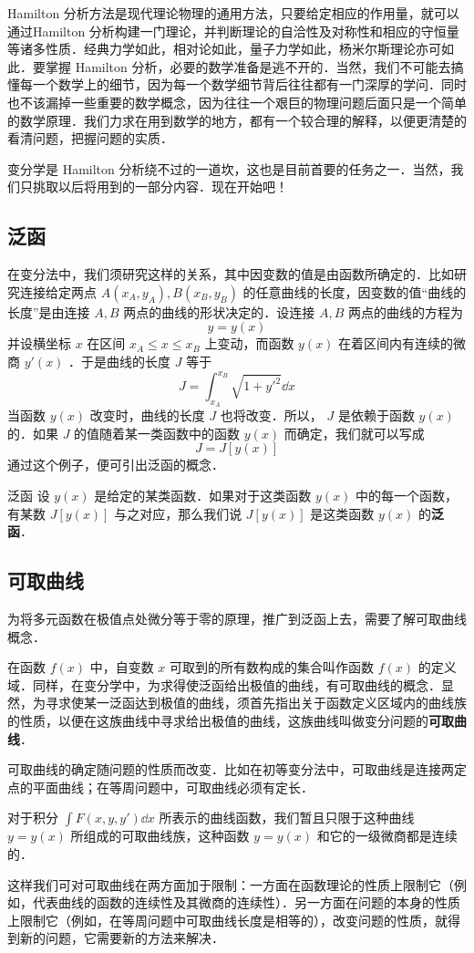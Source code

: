 
Hamilton 分析方法是现代理论物理的通用方法，只要给定相应的作用量，就可以通过Hamilton 分析构建一门理论，并判断理论的自洽性及对称性和相应的守恒量等诸多性质．经典力学如此，相对论如此，量子力学如此，杨米尔斯理论亦可如此．要掌握 Hamilton 分析，必要的数学准备是逃不开的．当然，我们不可能去搞懂每一个数学上的细节，因为每一个数学细节背后往往都有一门深厚的学问．同时也不该漏掉一些重要的数学概念，因为往往一个艰巨的物理问题后面只是一个简单的数学原理．我们力求在用到数学的地方，都有一个较合理的解释，以便更清楚的看清问题，把握问题的实质．

变分学是 Hamilton 分析绕不过的一道坎，这也是目前首要的任务之一．当然，我们只挑取以后将用到的一部分内容．现在开始吧！
\subsection{泛函}
在变分法中，我们须研究这样的关系，其中因变数的值是由函数所确定的．比如研究连接给定两点 $A(x_A,y_A),B(x_B,y_B)$ 的任意曲线的长度，因变数的值“曲线的长度”是由连接 $A,B$ 两点的曲线的形状决定的．设连接 $A,B$ 两点的曲线的方程为
\begin{equation}
y=y(x)
\end{equation}
并设横坐标 $x$ 在区间 $x_A\leq x\leq x_B$ 上变动，而函数 $y(x)$ 在着区间内有连续的微商 $y'(x)$ ．于是曲线的长度 $J$ 等于
\begin{equation}
J=\int_{x_A}^{x_B} \sqrt{1+y'^2}\dd x
\end{equation}
当函数 $y(x)$ 改变时，曲线的长度 $J$ 也将改变．所以， $J$ 是依赖于函数 $y(x)$ 的．如果 $J$ 的值随着某一类函数中的函数 $y(x)$ 而确定，我们就可以写成
\begin{equation}
J=J[y(x)]
\end{equation}
通过这个例子，便可引出泛函的概念．
\begin{definition}{泛函}
设 $y(x)$ 是给定的某类函数．如果对于这类函数 $y(x)$ 中的每一个函数，有某数 $J[y(x)]$ 与之对应，那么我们说 $J[y(x)]$ 是这类函数 $y(x)$ 的\textbf{泛函}．
\end{definition}
\subsection{可取曲线}
为将多元函数在极值点处微分等于零的原理，推广到泛函上去，需要了解可取曲线概念．

在函数 $f(x)$ 中，自变数 $x$ 可取到的所有数构成的集合叫作函数 $f(x)$ 的定义域．同样，在变分学中，为求得使泛函给出极值的曲线，有可取曲线的概念．显然，为寻求使某一泛函达到极值的曲线，须首先指出关于函数定义区域内的曲线族的性质，以便在这族曲线中寻求给出极值的曲线，这族曲线叫做变分问题的\textbf{可取曲线}．

可取曲线的确定随问题的性质而改变．比如在初等变分法中，可取曲线是连接两定点的平面曲线；在等周问题中，可取曲线必须有定长．

对于积分 $\int F(x,y,y')\dd x$ 所表示的曲线函数，我们暂且只限于这种曲线 $y=y(x)$ 所组成的可取曲线族，这种函数 $y=y(x)$ 和它的一级微商都是连续的．

这样我们可对可取曲线在两方面加于限制：一方面在函数理论的性质上限制它（例如，代表曲线的函数的连续性及其微商的连续性）．另一方面在问题的本身的性质上限制它（例如，在等周问题中可取曲线长度是相等的），改变问题的性质，就得到新的问题，它需要新的方法来解决．